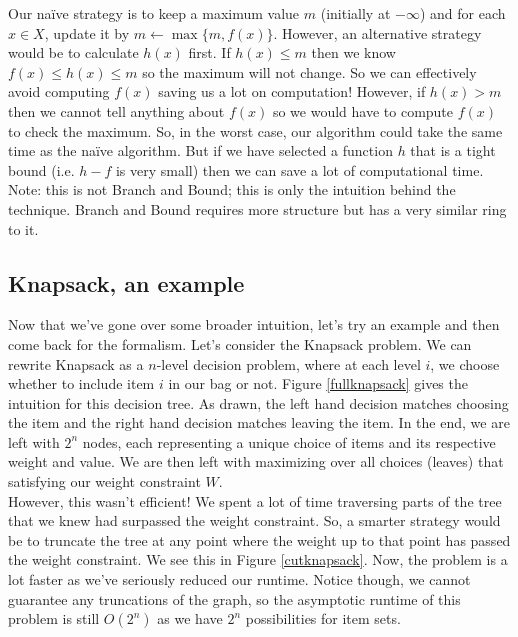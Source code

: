 \documentclass[11pt]{article}
\theoremstyle{plain}
\theoremstyle{definition}
\numberwithin{equation}{section}
\numberwithin{figure}{section}
\begin{document}
\noindent Our na\"ive strategy is to keep a maximum value $m$ (initially at $-\infty$) and for each $x \in X$, update it by $m \leftarrow \max \{m, f(x)\}$. However, an alternative strategy would be to calculate $h(x)$ first. If $h(x) \leq m$ then we know $f(x) \leq h(x) \leq m$ so the maximum will not change. So we can effectively avoid computing $f(x)$ saving us a lot on computation! However, if $h(x) > m$ then we cannot tell anything about $f(x)$ so we would have to compute $f(x)$ to check the maximum. So, in the worst case, our algorithm could take the same time as the na\"ive algorithm. But if we have selected a function $h$ that is a tight bound (i.e. $h - f$ is very small) then we can save a lot of computational time. \\

\noindent Note: this is not Branch and Bound; this is only the intuition behind the technique. Branch and Bound requires more structure but has a very similar ring to it.

\subsection{Knapsack, an example}
Now that we've gone over some broader intuition, let's try an example and then come back for the formalism. Let's consider the Knapsack problem. We can rewrite Knapsack as a $n$-level decision problem, where at each level $i$, we choose whether to include item $i$ in our bag or not. Figure \ref{fullknapsack} gives the intuition for this decision tree. As drawn, the left hand decision matches choosing the item and the right hand decision matches leaving the item. In the end, we are left with $2^n$ nodes, each representing a unique choice of items and its respective weight and value. We are then left with maximizing over all choices (leaves) that satisfying our weight constraint $W$. \\

\noindent However, this wasn't efficient! We spent a lot of time traversing parts of the tree that we knew had surpassed the weight constraint. So, a smarter strategy would be to truncate the tree at any point where the weight up to that point has passed the weight constraint. We see this in Figure \ref{cutknapsack}. Now, the problem is a lot faster as we've seriously reduced our runtime.  Notice though, we cannot guarantee any truncations of the graph, so the asymptotic runtime of this problem is still $O(2^n)$ as we have $2^n$ possibilities for item sets.
\end{document}

